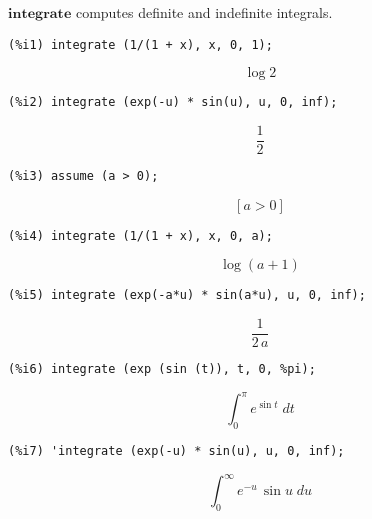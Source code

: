 \documentclass[12pt,leqno]{article}
\begin{document}
$\mathbf{integrate}$ computes definite and indefinite integrals.
\begin{verbatim}
(%i1) integrate (1/(1 + x), x, 0, 1);
\end{verbatim}
\begin{equation}
\log 2\tag{\%o1}
\label{eq:doc-group1-code29-1-1}
\end{equation}
\begin{verbatim}
(%i2) integrate (exp(-u) * sin(u), u, 0, inf);
\end{verbatim}
\begin{equation}
\frac{1}{2}\tag{\%o2}
\label{eq:doc-group1-code29-2-1}
\end{equation}
\begin{verbatim}
(%i3) assume (a > 0);
\end{verbatim}
\begin{equation}
\left[ a>0 \right] \tag{\%o3}
\label{eq:doc-group1-code29-3-1}
\end{equation}
\begin{verbatim}
(%i4) integrate (1/(1 + x), x, 0, a);
\end{verbatim}
\begin{equation}
\log \left(a+1\right)\tag{\%o4}
\label{eq:doc-group1-code29-4-1}
\end{equation}
\begin{verbatim}
(%i5) integrate (exp(-a*u) * sin(a*u), u, 0, inf);
\end{verbatim}
\begin{equation}
\frac{1}{2\,a}\tag{\%o5}
\label{eq:doc-group1-code29-5-1}
\end{equation}
\begin{verbatim}
(%i6) integrate (exp (sin (t)), t, 0, %pi);
\end{verbatim}
\begin{equation}
\int_{0}^{\pi}{e^{\sin t}\;dt}\tag{\%o6}
\label{eq:doc-group1-code29-6-1}
\end{equation}
\begin{verbatim}
(%i7) 'integrate (exp(-u) * sin(u), u, 0, inf);
\end{verbatim}
\begin{equation}
\int_{0}^{\infty }{e^ {- u }\,\sin u\;du}\tag{\%o7}
\label{eq:doc-group1-code29-7-1}
\end{equation}
\end{document}
